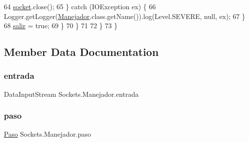 \begin{DoxyCode}
64                         \mbox{\hyperlink{class_sockets_1_1_manejador_a71819caa3c23e76fcd4faa94377cae72}{socket}}.close();
65                     \} \textcolor{keywordflow}{catch} (IOException ex) \{
66                         Logger.getLogger(\mbox{\hyperlink{class_sockets_1_1_manejador_a074d5730fb98ef489d0af3786f5e58cb}{Manejador}}.class.getName()).log(Level.SEVERE, null, ex);
67                     \}
68                     \mbox{\hyperlink{class_sockets_1_1_manejador_aa1ef67c0efe69c6b47c193c8d49a84f4}{salir}} = \textcolor{keyword}{true};
69                 \}
70             \}
71             
72         \}
73     \}
\end{DoxyCode}


\subsection{Member Data Documentation}
\mbox{\label{class_sockets_1_1_manejador_ac51aaab6667f8f43427bf39f8afb740a}} 
\subsubsection{\texorpdfstring{entrada}{entrada}}
{\footnotesize\ttfamily Data\+Input\+Stream Sockets.\+Manejador.\+entrada\hspace{0.3cm}{\ttfamily [private]}}

\mbox{\label{class_sockets_1_1_manejador_a9eebde9281de4525c33c8cf7ee278975}} 
\subsubsection{\texorpdfstring{paso}{paso}}
{\footnotesize\ttfamily \mbox{\hyperlink{class_sockets_1_1_paso}{Paso}} Sockets.\+Manejador.\+paso\hspace{0.3cm}{\ttfamily [private]}}

\mbox{\label{class_sockets_1_1_manejador_a88d7f7ec2ce70bf96c09b715358b1b9b}} 
